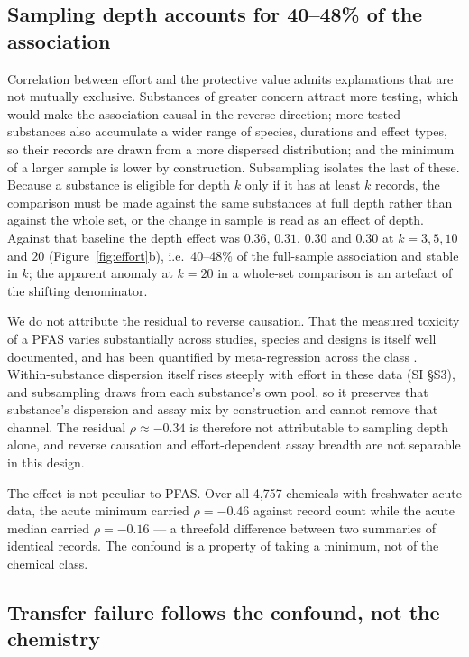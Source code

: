 \documentclass[preprint,12pt]{elsarticle}
\begin{document}
\subsection{Sampling depth accounts for 40--48\% of the association}

Correlation between effort and the protective value admits explanations that
are not mutually exclusive. Substances of greater concern attract more testing,
which would make the association causal in the reverse direction; more-tested
substances also accumulate a wider range of species, durations and effect types,
so their records are drawn from a more dispersed distribution; and the minimum
of a larger sample is lower by construction. Subsampling isolates the last of
these. Because a substance is eligible for depth $k$ only if it has at least $k$
records, the comparison must be made against the same substances at full depth
rather than against the whole set, or the change in sample is read as an effect
of depth. Against that baseline the depth effect was $0.36$, $0.31$, $0.30$ and
$0.30$ at $k=3,5,10$ and $20$ (Figure~\ref{fig:effort}b), i.e.\ 40--48\% of the
full-sample association and stable in $k$; the apparent anomaly at $k=20$ in a
whole-set comparison is an artefact of the shifting denominator.

We do not attribute the residual to reverse causation. That the measured
toxicity of a PFAS varies substantially across studies, species and designs is
itself well documented, and has been quantified by meta-regression across the
class \cite{shabaka2026metareg}. Within-substance
dispersion itself rises steeply with effort in these data (SI \S S3), and
subsampling draws from each substance's own pool, so it preserves that
substance's dispersion and assay mix by construction and cannot remove that
channel. The residual $\rho\approx-0.34$ is therefore not attributable to
sampling depth alone, and reverse causation and effort-dependent assay breadth
are not separable in this design.

The effect is not peculiar to PFAS. Over all 4{,}757 chemicals with freshwater
acute data, the acute minimum carried $\rho=-0.46$ against record count while
the acute median carried $\rho=-0.16$ --- a threefold difference between two
summaries of identical records. The confound is a property of taking a minimum,
not of the chemical class.

\subsection{Transfer failure follows the confound, not the chemistry}
\end{document}
